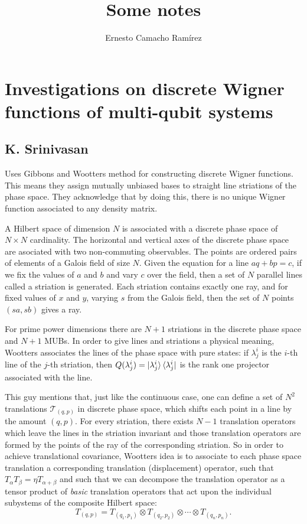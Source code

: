 \documentclass[a4paper]{article}
\title{Some notes}
\author{Ernesto Camacho Ramírez}
\begin{document}
  \maketitle
  
  \section{Investigations on discrete Wigner functions of
  multi-qubit systems}

  \subsection{K. Srinivasan}

  Uses Gibbons and Wootters method for constructing discrete
  Wigner functions. This means they assign mutually unbiased
  bases to straight line striations of the phase space. They
  acknowledge that by doing this, there is no unique Wigner
  function associated to any density matrix. 

  A Hilbert space of dimension $N$ is associated with a
  discrete phase space of $N \times N$ cardinality. The
  horizontal and vertical axes of the discrete phase space
  are asociated with two non-commuting observables. The
  points are ordered pairs of elements of a Galois field of
  size $N$. Given the equation for a line $aq + bp = c$, if
  we fix the values of $a$ and $b$ and vary $c$ over the
  field, then a set of $N$ parallel lines called a striation
  is generated. Each striation contains exactly one ray, and
  for fixed values of $x$ and $y$, varying  $s$ from the
  Galois field, then the set of $N$ points $(sa,sb)$ gives a
  ray.

  For prime power dimensions there are $N+1$ striations in
  the discrete phase space and $N+1$ MUBs. In order to give
  lines and striations a physical meaning, Wootters
  associates the lines of the phase space with pure states:
  if $\lambda_j^i$ is the $i$-th line of the $j$-th
  striation, then $Q(\lambda_j^i) =
  \ket{\lambda_j^i}\bra{\lambda_j^i}$ is the rank one
  projector associated with the line.

  This guy mentions that, just like the continuous case, one
  can define a set of $N^2$ translations $\mathcal
  T_{(q,p)}$ in discrete phase space, which shifts each
  point in a line by the amount $(q,p)$. For every
  striation, there exists $N-1$ translation operators which
  leave the lines in the striation invariant and those
  translation operators are formed by the points of the ray
  of the corresponding striation. So in order to achieve
  translational covariance, Wootters idea is to associate to
  each phase space translation a corresponding translation
  (displacement) operator, such that $T_\alpha T_\beta =
  \eta T_{\alpha+\beta}$ and such that we can decompose the
  translation operator as a tensor product of
  \textit{basic} translation operators that act upon the
  individual subystems of the composite Hilbert space:
  \[
    T_{(q,p)}
    = T_{(q_1,p_1)} \otimes T_{(q_2,p_2)} \otimes \cdots
    \otimes T_{(q_n,p_n)}.
  \] 
\end{document}
